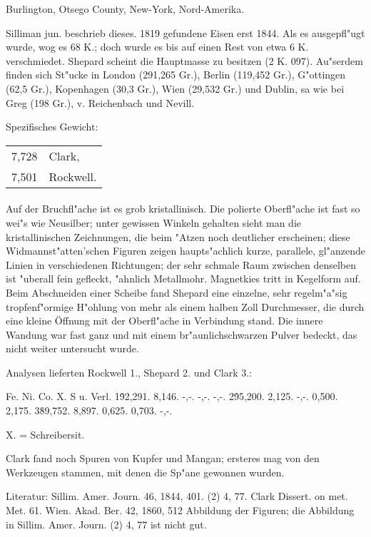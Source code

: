 \documentclass[a4paper, 11pt, oneside]{article}
\begin{document}
Burlington, Otsego County, New-York, Nord-Amerika.

Silliman jun. beschrieb dieses. 1819 gefundene Eisen erst 1844. Als es ausgepfl"ugt wurde, wog es 68 K.; doch wurde es bis auf einen Rest von etwa 6 K. verschmiedet. Shepard scheint die Hauptmasse zu besitzen (2 K. 097). Au"serdem finden sich St"ucke in London (291,265 Gr.), Berlin (119,452 Gr.), G"ottingen (62,5 Gr.), Kopenhagen (30,3 Gr.), Wien (29,532 Gr.) und Dublin, sa wie bei Greg (198 Gr.), v. Reichenbach und Nevill.

Spezifisches Gewicht:  
\begin{table}[!ht]
    \centering
    \begin{tabular}{l l}
        7,728 & Clark,\\
        7,501 & Rockwell.
    \end{tabular}
\end{table}
\paragraph{}
Auf der Bruchfl"ache ist es grob kristallinisch. Die polierte Oberfl"ache ist fast so wei"s wie Neusilber; unter gewissen Winkeln gehalten sieht man die kristallinischen Zeichnungen, die beim "Atzen noch deutlicher erscheinen; diese Widmannst"atten'schen Figuren zeigen haupts"achlich kurze, parallele, gl"anzende Linien in verschiedenen Richtungen; der sehr schmale Raum zwischen denselben ist "uberall fein gefleckt, "ahnlich Metallmohr. Magnetkies tritt in Kegelform auf. Beim Abschneiden einer Scheibe fand Shepard eine einzelne, sehr regelm"a"sig tropfenf"ormige H"ohlung von mehr als einem halben Zoll Durchmesser, die durch eine kleine Öffnung mit der Oberfl"ache in Verbindung stand. Die innere Wandung war fast ganz und mit einem br"aunlichschwarzen Pulver bedeckt, das nicht weiter untersucht wurde.

Analysen lieferten Rockwell 1., Shepard 2. und Clark 3.:

Fe. Ni. Co. X. S u. Verl.  
1\. 92,291. 8,146. -,-. -,-. -,-.  
2\. 95,200. 2,125. -,-. 0,500. 2,175.  
3\. 89,752. 8,897. 0,625. 0,703. -,-.

X. = Schreibersit.

Clark fand noch Spuren von Kupfer und Mangan; ersteres mag von den Werkzeugen stammen, mit denen die Sp"ane gewonnen wurden.

Literatur: Sillim. Amer. Journ. 46, 1844, 401. (2) 4, 77. Clark Dissert. on met. Met. 61. Wien. Akad. Ber. 42, 1860, 512 Abbildung der Figuren; die Abbildung in Sillim. Amer. Journ. (2) 4, 77 ist nicht gut.
\end{document}
